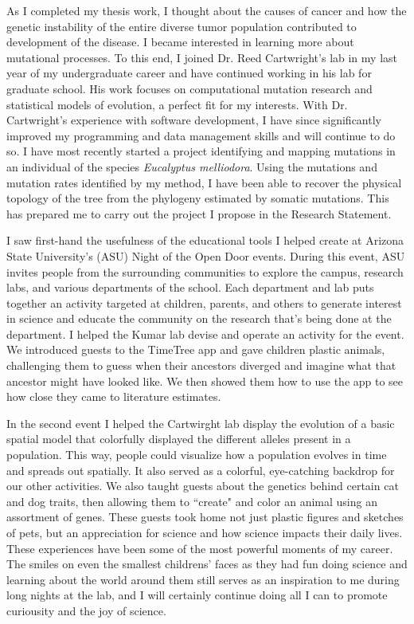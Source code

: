 \documentclass[12pt]{article}
\begin{document}
As I completed my thesis work, I thought about the causes of cancer and how the genetic instability of the entire diverse tumor population contributed to development of the disease. I became interested in learning more about mutational processes. To this end, I joined Dr. Reed Cartwright's lab in my last year of my undergraduate career and have continued working in his lab for graduate school. His work focuses on computational mutation research and statistical models of evolution, a perfect fit for my interests. With Dr. Cartwright's experience with software development, I have since significantly improved my programming and data management skills and will continue to do so. I have most recently started a project identifying and mapping mutations in an individual of the species \textit{Eucalyptus melliodora}. Using the mutations and mutation rates identified by my method, 
I have been able to recover the physical topology of the tree from the phylogeny estimated by somatic mutations. This has prepared me to carry out the project I propose in the Research Statement.

I saw first-hand the usefulness of the educational tools I helped create at Arizona State University's (ASU)
Night of the Open Door events. During this event, ASU invites people from the surrounding communities to explore the campus, research labs, and various departments of the school. Each department and lab puts together an activity targeted at children, parents, and others to generate interest in science and educate the community on the research that's being done at the department. I helped the Kumar lab devise and operate an activity for the event. We introduced guests to the TimeTree app and gave children plastic animals, challenging them to guess when their ancestors diverged and imagine what that ancestor might have looked like. We then showed them how to use the app to see how close they came to literature estimates.

In the second event I helped the Cartwirght lab display the evolution of a basic spatial model that colorfully displayed the different alleles present in a population. This way, people could visualize how a population evolves in time and spreads out spatially. It also served as a colorful, eye-catching backdrop for our other activities. We also taught guests about the genetics behind certain cat and dog traits, then allowing them to ``create" and color an animal using an assortment of genes. These guests took home not just plastic figures and sketches of pets, but an appreciation for science and how science impacts their daily lives. These experiences have been some of the most powerful moments of my career. The smiles on even the smallest childrens' faces as they had fun doing science and learning about the world around them still serves as an inspiration to me during long nights at the lab, and I will certainly continue doing all I can to promote curiousity and the joy of science.
\end{document}
